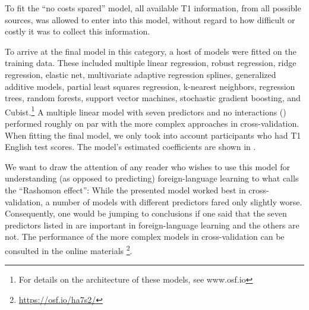 \documentclass[output=paper]{langsci/langscibook}
\begin{document}
To fit the ``no costs spared'' model, all available T1 information, from all possible sources, was allowed to enter into this model, without regard to how difficult or costly it was to collect this information. 

To arrive at the final model in this category, a host of models were fitted on the training data. These included multiple linear regression, robust regression, ridge regression, elastic net, multivariate adaptive regression splines, generalized additive models, partial least squares regression, k-nearest neighbors, regression trees, random forests, support vector machines, stochastic gradient boosting, and Cubist.\footnote{For details on the architecture of these models, see www.osf.io} A multiple linear model with seven predictors and no interactions () performed roughly on par with the more complex approaches in cross-validation. When fitting the final model, we only took into account participants who had T1 English test scores. The model’s estimated coefficients are shown in . 

We want to draw the attention of any reader who wishes to use this model for understanding (as opposed to predicting) foreign-language learning to what \citet{Breiman2001} calls the ``Rashomon effect'': While the presented model worked best in cross-validation, a number of models with different predictors fared only slightly worse. Consequently, one would be jumping to conclusions if one said that the seven predictors listed in  are important in foreign-language learning and the others are not. The performance of the more complex models in cross-validation can be consulted in the online materials \footnote{\url{https://osf.io/ha7s2/}}.
\end{document}
